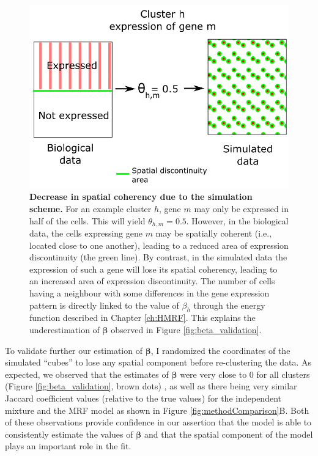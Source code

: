 	\begin{figure}[H]
\centerline{\includegraphics[width=\linewidth]{gfx/chapter5/beta_error.png}}
\caption{{\bf Decrease in spatial coherency due to the simulation scheme.} For an example cluster $h$, gene $m$ may only be expressed in half of the cells. This will yield $\theta_{h,m} = 0.5$. However, in the biological data, the cells expressing gene $m$ may be spatially coherent (i.e., located close to one another), leading to a reduced area of expression discontinuity (the green line). By contrast, in the simulated data the expression of such a gene will lose its spatial coherency, leading to an increased area of expression discontinuity. The number of cells having a neighbour with some differences in the gene expression pattern is directly linked to the value of $\beta_h$ through the energy function described in Chapter \ref{ch:HMRF}. This explains the underestimation of $\boldsymbol{\beta}$ observed in Figure \ref{fig:beta_validation}.}
\label{fig:beta_error}
	\end{figure}

To validate further our estimation of $\boldsymbol{\beta}$, I randomized the coordinates of the simulated ``cubes'' to lose any spatial component before re-clustering the data. As expected, we observed that the estimates of $\boldsymbol{\beta}$ were very close to $0$ for all clusters (Figure \ref{fig:beta_validation}, brown dots) , as well as there being very similar Jaccard coefficient values (relative to the true values) for the independent mixture and the MRF model as shown in Figure \ref{fig:methodComparison}B. Both of these observations provide confidence in our assertion that the model is able to consistently estimate the values of $\boldsymbol{\beta}$ and that the spatial component of the model plays an important role in the fit.\\
	
